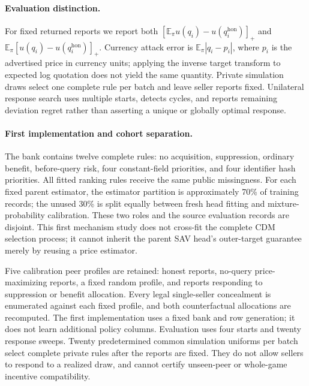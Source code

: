 \paragraph{Evaluation distinction.}
For fixed returned reports we report both
$[\mathbb{E}_\pi u(q_i)-u(q_i^{\mathrm{hon}})]_+$ and
$\mathbb{E}_\pi[u(q_i)-u(q_i^{\mathrm{hon}})]_+$. Currency attack error is
$\mathbb{E}_\pi|q_i-p_i|$, where $p_i$ is the advertised price in currency
units; applying the inverse target transform to expected
log quotation does not yield the same quantity. Private simulation draws
select one complete rule per batch and leave seller reports fixed. Unilateral
response search uses multiple starts, detects cycles, and reports remaining
deviation regret rather than asserting a unique or globally optimal response.

\paragraph{First implementation and cohort separation.}
The bank contains twelve complete rules: no acquisition, suppression, ordinary
benefit, before-query risk, four constant-field priorities, and four identifier
hash priorities. All fitted ranking rules receive the same public missingness.
For each fixed parent estimator, the estimator partition is approximately
70\% of training records; the unused 30\% is split equally between fresh
head fitting and mixture-probability calibration. These two roles and the
source evaluation records are disjoint. This first mechanism study does not
cross-fit the complete CDM selection process; it cannot inherit the
parent SAV head's outer-target guarantee merely by reusing a price estimator.

Five calibration peer profiles are retained: honest reports, no-query
price-maximizing reports, a fixed random profile, and reports responding to
suppression or benefit allocation. Every legal single-seller concealment is
enumerated against each fixed profile, and both counterfactual allocations
are recomputed. The first implementation uses a fixed bank and row generation;
it does not learn additional policy columns. Evaluation uses four starts and
twenty response sweeps. Twenty predetermined common simulation uniforms per
batch select complete private rules after the reports are fixed. They do not
allow sellers to respond to a realized draw, and cannot certify unseen-peer
or whole-game incentive compatibility.
